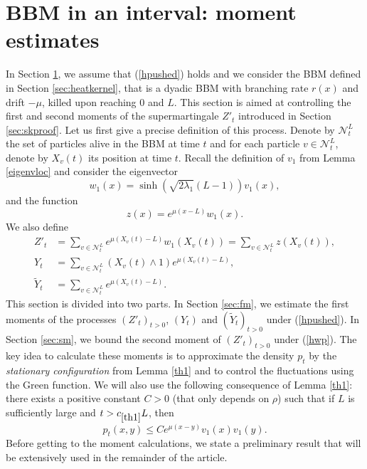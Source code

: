 \documentclass[11pt]{article}
\theoremstyle{plain}
\begin{document}
	
\section[Branching Brownian motion in an interval: moment estimates]{BBM in an interval: moment estimates}\label{sec:moment:est}
\setcounter{equation}{0}
In Section \ref{sec:moment:est}, we assume that (\ref{hpushed}) holds and we consider the  BBM defined in Section \ref{sec:heatkernel}, that is a dyadic BBM with branching rate $r(x)$ and drift $-\mu$, killed upon reaching $0$ and $L$. This section is aimed at controlling the first and second moments of the supermartingale $Z'_t$ introduced in Section \ref{sec:skproof}. Let us first give a precise definition of this process. Denote by $\mathcal{N}_t^L$ the set of particles alive in the BBM at time $t$ and for each particle $v\in\mathcal{N}^L_t$, denote by $X_v(t)$ its position at time $t$. Recall the definition of $v_1$ from Lemma \ref{eigenvloc} and consider the eigenvector 
\begin{equation}   
    w_1(x)=\sinh\left(\sqrt{2\lambda_1}(L-1)\right)v_1(x), \label{def:w1}
\end{equation}
and the function 
\begin{equation}
z(x)=e^{\mu(x-L)}w_1(x) \label{def:z}.
\end{equation}
We also define 
\begin{align}
Z'_t&=\sum_{v\in\mathcal{N}_t^L}e^{\mu(X_v(t)-L)}w_1(X_v(t))=\sum_{v\in\mathcal{N}_t^L}z(X_v(t))\label{def:Z},\\
Y_t&=\sum_{v\in\mathcal{N}_t^L}(X_v(t)\wedge 1)e^{\mu(X_v(t)-L)}\label{def:Y},\\
\tilde{Y}_t&=\sum_{v\in\mathcal{N}_t^L}e^{\mu(X_v(t)-L)}.\label{def:tY}
\end{align} 
This section is  divided into two parts. In Section \ref{sec:fm}, we estimate the first moments of the processes $(Z'_t)_{t>0}$, $(Y_t)$ and $(\tilde{Y}_t)_{t>0}$ under (\ref{hpushed}).  In Section \ref{sec:sm}, we bound the second moment of $(Z'_t)_{t>0}$ under (\ref{hwp}). The key idea to calculate these moments is to approximate the density $p_t$ by the \textit{stationary configuration} from Lemma \ref{th1} and to control the fluctuations using the Green function. We will also use the following consequence of Lemma \ref{th1}: there exists a positive constant $C>0$ (that only depends on $\rho$) such that if $L$ is sufficiently large and $t>c_{\ref{th1}}L$, then
\begin{equation}
p_t(x,y)\leqslant C e^{\mu(x-y)} v_1(x)v_1(y).\label{ub:pt2}
\end{equation}
Before getting to the moment calculations, we state a preliminary result that will be extensively used in the remainder of the article.
\end{document}

